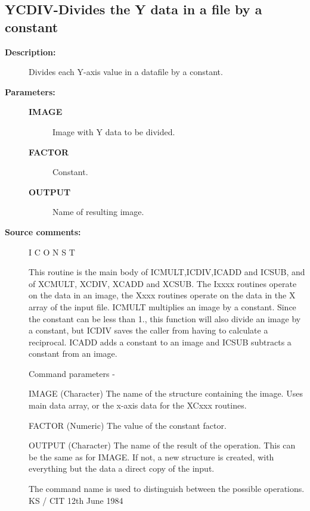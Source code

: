 \subsection{YCDIV-\label{YCDIV}Divides the Y data in a file by a constant}
\begin{description}

\item [\textbf{Description:}]
 Divides each Y-axis value in a datafile by a constant.

\item [\textbf{Parameters:}]
\begin{description}
\item [\textbf{IMAGE}]
 Image with Y data to be divided.
\item [\textbf{FACTOR}]
 Constant.
\item [\textbf{OUTPUT}]
 Name of resulting image.
\end{description}

\item [\textbf{Source comments:}]
\begin{terminalv}
 I C O N S T

 This routine is the main body of ICMULT,ICDIV,ICADD and ICSUB,
 and of XCMULT, XCDIV, XCADD and XCSUB.  The Ixxxx routines
 operate on the data in an image, the Xxxx routines operate on
 the data in the X array of the input file.
 ICMULT multiplies an image by a constant.  Since the constant
 can be less than 1., this function will also divide an
 image by a constant, but ICDIV saves the caller from having
 to calculate a reciprocal. ICADD adds a constant to an image and
 ICSUB subtracts a constant from an image.

 Command parameters -

 IMAGE  (Character) The name of the structure containing the image.
        Uses main data array, or the x-axis data for the XCxxx routines.

 FACTOR (Numeric) The value of the constant factor.

 OUTPUT (Character) The name of the result of the operation.  This
        can be the same as for IMAGE.  If not, a new structure
        is created, with everything but the data a direct
        copy of the input.

 The command name is used to distinguish between the
 possible operations.
                                  KS / CIT 12th June 1984
\end{terminalv}
\end{description}
